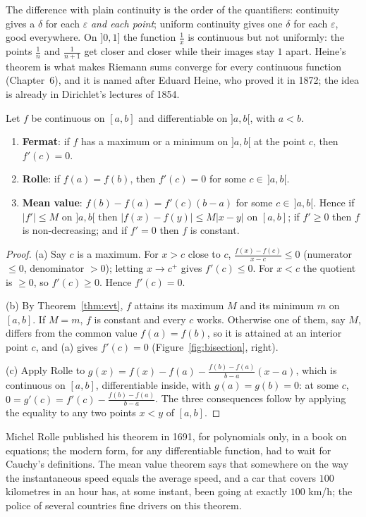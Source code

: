 The difference with plain continuity is the order of the quantifiers: continuity gives a $\delta$ for each $\varepsilon$ \emph{and each point}; uniform continuity
gives one $\delta$ for each $\varepsilon$, good everywhere. On $]0,1]$ the function $\frac1x$ is continuous but not uniformly: the points $\frac1n$ and $\frac1{n+1}$ get
closer and closer while their images stay $1$ apart. Heine's theorem is what makes Riemann sums converge for every continuous function (Chapter~6), and it
is named after Eduard Heine, who proved it in 1872; the idea is already in Dirichlet's lectures of 1854.

\begin{theorem}\label{thm:mvt}
Let $f$ be continuous on $[a,b]$ and differentiable on $]a,b[$, with $a<b$.
\begin{enumerate}[label=(\alph*)]
\item \textbf{Fermat}: if $f$ has a maximum or a minimum on $]a,b[$ at the point $c$, then $f'(c)=0$.
\item \textbf{Rolle}: if $f(a)=f(b)$, then $f'(c)=0$ for some $c\in\,]a,b[$.
\item \textbf{Mean value}: $f(b)-f(a)=f'(c)(b-a)$ for some $c\in\,]a,b[$. Hence if $|f'|\le M$ on $]a,b[$ then $|f(x)-f(y)|\le M|x-y|$ on $[a,b]$; if $f'\ge0$ then $f$ is non-decreasing; and if $f'=0$ then $f$ is constant.
\end{enumerate}
\end{theorem}
\begin{proof}
(a) Say $c$ is a maximum. For $x>c$ close to $c$, $\frac{f(x)-f(c)}{x-c}\le0$ (numerator $\le0$, denominator $>0$); letting $x\to c^+$ gives $f'(c)\le0$.
For $x<c$ the quotient is $\ge0$, so $f'(c)\ge0$. Hence $f'(c)=0$.

(b) By Theorem~\ref{thm:evt}, $f$ attains its maximum $M$ and its minimum $m$ on $[a,b]$. If $M=m$, $f$ is constant and every $c$ works. Otherwise one of them, say $M$,
differs from the common value $f(a)=f(b)$, so it is attained at an interior point $c$, and (a) gives $f'(c)=0$ (Figure~\ref{fig:bisection}, right).

(c) Apply Rolle to $g(x)=f(x)-f(a)-\frac{f(b)-f(a)}{b-a}(x-a)$, which is continuous on $[a,b]$, differentiable inside, with $g(a)=g(b)=0$: at some $c$,
$0=g'(c)=f'(c)-\frac{f(b)-f(a)}{b-a}$. The three consequences follow by applying the equality to any two points $x<y$ of $[a,b]$.
\end{proof}

Michel Rolle published his theorem in 1691, for polynomials only, in a book on equations; the modern form, for any differentiable function, had to
wait for Cauchy's definitions. The mean value theorem says that somewhere on the way the instantaneous speed equals the average speed, and a car that
covers $100$ kilometres in an hour has, at some instant, been going at exactly $100$ km/h; the police of several countries fine drivers on this theorem.

